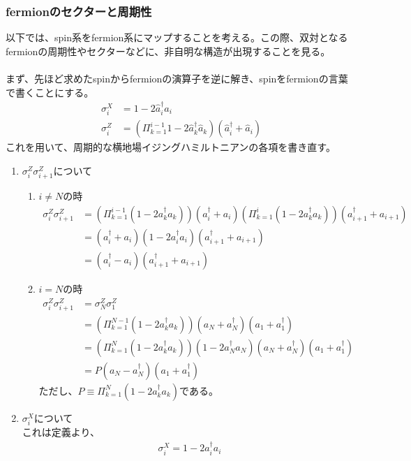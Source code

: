 \documentclass[a4paper,10.5pt]{article}
\numberwithin{equation}{section}
\begin{document}
\subsubsection{fermionのセクターと周期性}
以下では、spin系をfermion系にマップすることを考える。この際、双対となるfermionの周期性やセクターなどに、非自明な構造が出現することを見る。\\
\\
まず、先ほど求めたspinからfermionの演算子を逆に解き、spinをfermionの言葉で書くことにする。
\begin{equation}\begin{split}
\sigma_{i}^{X} &= 1-2\hat{a}_{i}^{\dagger}\hat{a}_{i}  \\
\sigma_{i}^{Z} &= (\Pi_{k=1}^{i-1} 1-2\hat{a}_{k}^{\dagger}\hat{a}_{k} ) (\hat{a}_{i}^{\dagger}+\hat{a}_{i})
\end{split} \end{equation}
これを用いて、周期的な横地場イジングハミルトニアンの各項を書き直す。
\begin{enumerate}
    \item $\sigma_{i}^{Z}\sigma^{Z}_{i+1}$について
    \begin{enumerate}
        \item $i\neq N$の時
        \begin{align*}
            \sigma_{i}^{Z}\sigma^{Z}_{i+1}&=(\Pi_{k=1}^{i-1}(1-2a^{\dagger}_{k}a_{k}))(a_{i}^{\dagger}+a_{i})(\Pi_{k=1}^{i}(1-2a^{\dagger}_{k}a_{k}))(a_{i+1}^{\dagger}+a_{i+1})\\
            &=(a_{i}^{\dagger}+a_{i})(1-2a_{i}^{\dagger}a_{i})(a_{i+1}^{\dagger}+a_{i+1})\\
            &=(a_{i}^{\dagger}-a_{i})(a_{i+1}^{\dagger}+a_{i+1})
        \end{align*}
        \item $i=N$の時
        \begin{align*}
            \sigma_{i}^{Z}\sigma^{Z}_{i+1}&=\sigma_{N}^{Z}\sigma_{1}^{Z}\\
            &=(\Pi_{k=1}^{N-1}(1-2a_{k}^{\dagger}a_{k}))(a_{N}+a_{N}^{\dagger})(a_{1}+a_{1}^{\dagger})\\
            &=(\Pi_{k=1}^{N}(1-2a_{k}^{\dagger}a_{k}))(1-2a_{N}^{\dagger}a_{N})(a_{N}+a_{N}^{\dagger})(a_{1}+a_{1}^{\dagger})\\
            &=P(a_{N}-a_{N}^{\dagger})(a_{1}+a_{1}^{\dagger})
        \end{align*}
        ただし、$P\equiv\Pi_{k=1}^{N}(1-2a_{k}^{\dagger}a_{k}) $である。
    \end{enumerate}
    \item $\sigma_{i}^{X}$について\\
    これは定義より、
    \begin{align*}
        \sigma_{i}^{X}=1-2a_{i}^{\dagger}a_{i}
    \end{align*}
\end{enumerate}
\end{document}

